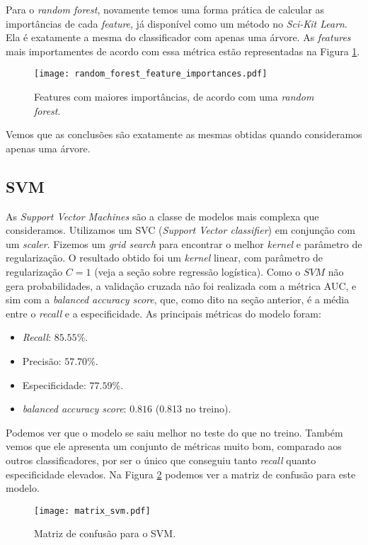 Para o \emph{random forest}, novamente temos uma forma prática de calcular as importâncias de cada \emph{feature}, já disponível como um método no \emph{Sci-Kit Learn}.
Ela é exatamente a mesma do classificador com apenas uma árvore.
As \emph{features} mais importamentes de acordo com essa métrica estão representadas na Figura \ref{random forest feature}.
\begin{figure}[htb]
    \begin{center}
        \texttt{[image: random\_forest\_feature\_importances.pdf]}
    \end{center}
    \caption{Features com maiores importâncias, de acordo com uma \emph{random forest}.}
    \label{random forest feature}
\end{figure}
Vemos que as conclusões são exatamente as mesmas obtidas quando consideramos apenas uma árvore.

\subsection{SVM}

As \emph{Support Vector Machines} são a classe de modelos mais complexa que consideramos.
Utilizamos um SVC (\emph{Support Vector classifier}) em conjunção com um \emph{scaler}.
Fizemos um \emph{grid search} para encontrar o melhor \emph{kernel} e parâmetro de regularização.
O resultado obtido foi um \emph{kernel} linear, com parâmetro de regularização \( C = 1 \) (veja a seção sobre regressão logística).
Como o \( SVM \) não gera probabilidades, a validação cruzada não foi realizada com a métrica AUC, e sim com a \emph{balanced accuracy score}, que, como dito na seção anterior, é a média entre o \emph{recall} e a especificidade.
As principais métricas do modelo foram:
\begin{itemize}
    \item \emph{Recall}: \( 85.55 \% \).
    \item Precisão: \( 57.70 \% \).
    \item Especificidade: \( 77.59 \% \).
    \item \emph{balanced accuracy score}: \( 0.816 \) (0.813 no treino).
\end{itemize}
Podemos ver que o modelo se saiu melhor no teste do que no treino.
Também vemos que ele apresenta um conjunto de métricas muito bom, comparado aos outros classificadores, por ser o único que conseguiu tanto \emph{recall} quanto especificidade elevados.
Na Figura \ref{svm metric} podemos ver a matriz de confusão para este modelo.
\begin{figure}[htb]
    \begin{center}
        \texttt{[image: matrix\_svm.pdf]} \\
    \end{center}
    \caption{Matriz de confusão para o SVM.}
    \label{svm metric}
\end{figure}
